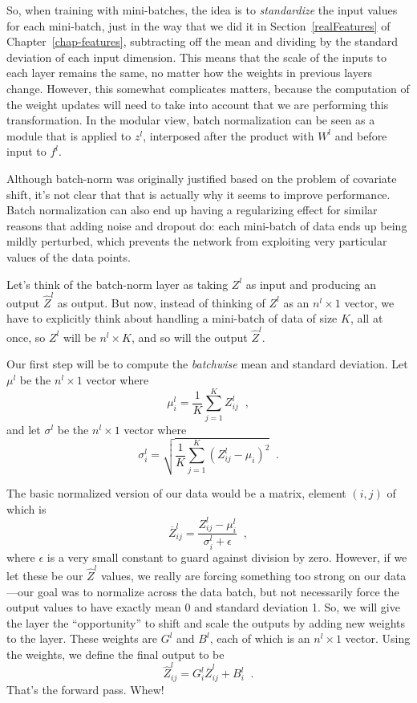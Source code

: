 So, when training with mini-batches, the idea is to {\em standardize}
the input values for each mini-batch, just in the way that we did it
in Section~\ref{realFeatures} of Chapter~\ref{chap-features}, subtracting off the mean
and dividing by the standard deviation of each input dimension.  This
means that the scale of the inputs to each layer remains the same, no
matter how the weights in previous layers change.  However, this
somewhat complicates matters, because the computation of the weight
updates will need to take into account that we are performing this
transformation.  In the modular view, batch normalization can be seen
as a module that is applied to $z^l$, interposed after the product
with $W^l$ and before input to $f^l$.

Although batch-norm was originally justified based on the problem of
covariate shift, it's not clear that that is actually why it seems to
improve performance.
Batch normalization can also end up having a regularizing effect for similar
reasons that adding noise and dropout do:  each mini-batch of data
ends up being mildly perturbed, which prevents the network from
exploiting very particular values of the data points.

Let's think of the batch-norm layer as taking $Z^l$ as input and
producing an output $\widehat{Z}^l$ as output.  But now, instead of
thinking of $Z^l$ as an $n^l \times 1$ vector, we have to explicitly
think about handling a mini-batch of data of size $K$, all at once, so
$Z^l$ will be $n^l \times K$, and so will the output $\widehat{Z}^l$.

Our first step will be to compute the {\em batchwise} mean and
standard deviation.  Let $\mu^l$ be the $n^l \times 1$ vector where
\[\mu^l_i = \frac{1}{K} \sum_{j = 1}^K Z^l_{ij}\;\;,\]
and let $\sigma^l$ be the $n^l \times 1$ vector where
\[\sigma^l_i = \sqrt{\frac{1}{K} \sum_{j = 1}^K (Z^l_{ij} - \mu_i)^2}\;\;.\]

The basic normalized version of our data would be a matrix,
element $(i, j)$ of which is
\[\overline{Z}^l_{ij} = \frac{Z^l_{ij} - \mu^l_i}{\sigma^l_i + \epsilon}\;\;,\]
where $\epsilon$ is a very small constant to guard against division by
zero.
However, if we let these be our $\widehat{Z}^l$ values, we really are
forcing something too strong on our data---our goal was to normalize
across the data batch, but not necessarily force the output values to
have exactly mean 0 and standard deviation 1.  So, we will give the
layer the ``opportunity'' to shift and scale the outputs by adding new
weights to the layer.  These weights are $G^l$ and $B^l$, each of
which is an $n^l \times 1$ vector.  Using the weights, we define the
final output to be
\[\widehat{Z}^l_{ij} = G^l_i \overline{Z}^l_{ij} + B^l_i\;\;.\]
That's the forward pass.  Whew!

